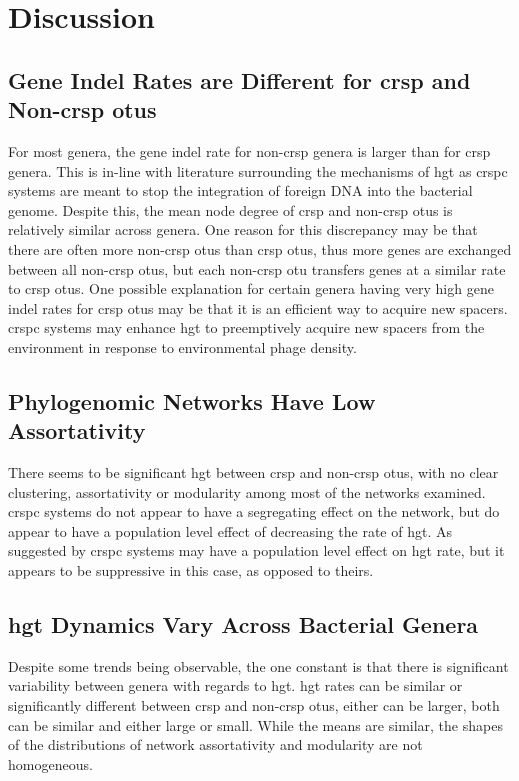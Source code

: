 \section{Discussion}
\subsection{Gene Indel Rates are Different for \ac{crsp} and Non-\ac{crsp} \ac{otu}s}
For most genera, the gene indel rate for non-\ac{crsp} genera is larger than for \ac{crsp} genera.
This is in-line with literature surrounding the mechanisms of \ac{hgt} as \ac{crspc} systems are meant to stop the integration of foreign DNA into the bacterial genome.
Despite this, the mean node degree of \ac{crsp} and non-\ac{crsp} \ac{otu}s is relatively similar across genera.
One reason for this discrepancy may be that there are often more non-\ac{crsp} \ac{otu}s than \ac{crsp} \ac{otu}s, thus more genes are exchanged between all non-\ac{crsp} \ac{otu}s, but each non-\ac{crsp} \ac{otu} transfers genes at a similar rate to \ac{crsp} \ac{otu}s.
One possible explanation for certain genera having very high gene indel rates for \ac{crsp} \ac{otu}s may be that it is an efficient way to acquire new spacers.
\ac{crspc} systems may enhance \ac{hgt} to preemptively acquire new spacers from the environment in response to environmental phage density.
\subsection{Phylogenomic Networks Have Low Assortativity}
There seems to be significant \ac{hgt} between \ac{crsp} and non-\ac{crsp} \ac{otu}s, with no clear clustering, assortativity or modularity among most of the networks examined.
\ac{crspc} systems do not appear to have a segregating effect on the network, but do appear to have a population level effect of decreasing the rate  of \ac{hgt}.
As suggested by \citep{transhgt} \ac{crspc} systems may have a population level effect on \ac{hgt} rate, but it appears to be suppressive in this case, as opposed to theirs.
\subsection{\ac{hgt} Dynamics Vary Across Bacterial Genera}
Despite some trends being observable, the one constant is that there is significant variability between genera with regards to \ac{hgt}.
\ac{hgt} rates can be similar or significantly different between \ac{crsp} and non-\ac{crsp} \ac{otu}s, either can be larger, both can be similar and either large or small.
While the means are similar, the shapes of the distributions of network assortativity and modularity are not homogeneous.
